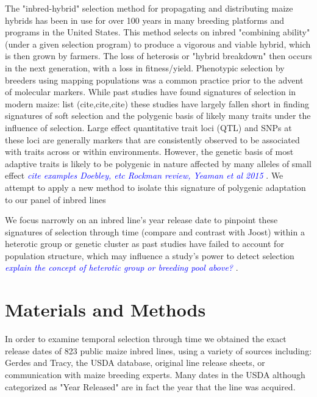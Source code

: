 \documentclass[9pt,twocolumn,twoside]{gsajnl}
\newcommand{\kc}[1]{\textcolor{blue}{ \emph{ #1}} }
\begin{document}
The "inbred-hybrid" selection method for propagating and distributing maize hybrids has been in use for over 100 years in many breeding platforms and programs in the United States. 
This method selects on inbred "combining ability" (under a given selection program) to produce a vigorous and viable hybrid, which is then grown by farmers. 
The loss of heterosis or "hybrid breakdown" then occurs in the next generation, with a loss in fitness/yield.
Phenotypic selection by breeders using mapping populations was a common practice prior to the advent of molecular markers. 
While past studies have found signatures of selection in modern maize: list (cite,cite,cite) these studies have largely fallen short in finding signatures of soft selection and the polygenic basis of likely many traits under the influence of selection. 
Large effect quantitative trait loci (QTL) and SNPs at these loci are generally markers that are consistently observed to be associated with traits across or within environments. 
However, the genetic basis of most adaptive traits is likely to be polygenic in nature affected by many alleles of small effect \kc{cite examples Doebley, etc Rockman review, Yeaman et al 2015}. We attempt to apply a new method to isolate this signature of polygenic adaptation to our panel of inbred lines

We focus narrowly on an inbred line's year release date to pinpoint these signatures of selection through time (compare and contrast with Joost) within a heterotic group or genetic cluster as past studies have failed to account for population structure, which may influence a study's power to detect selection \kc{explain the concept of heterotic group or breeding pool above?}. 



\section*{Materials and Methods}

In order to examine temporal selection through time we obtained the exact release dates of 823 public maize inbred lines, using a variety of sources including: Gerdes and Tracy, the USDA database, original line release sheets, or communication with maize breeding experts. Many dates in the USDA although categorized as "Year Released" are in fact the year that the line was acquired. 
\end{document}
